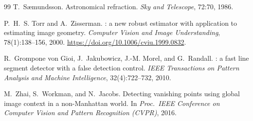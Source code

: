\documentclass[11pt,a4paper]{article}
\newcommand{\doi}[1]{\url{https://doi.org/#1}}
\begin{document}
\begin{thebibliography}{99}
T.~S{\ae}mundsson.
\newblock Astronomical refraction.
\newblock \emph{Sky and Telescope}, 72:70, 1986.

P.~H.~S. Torr and A.~Zisserman.
: a new robust estimator with application to estimating image geometry.
\newblock \emph{Computer Vision and Image Understanding}, 78(1):138--156, 2000.
\newblock \doi{10.1006/cviu.1999.0832}.

R.~Grompone von Gioi, J.~Jakubowicz, J.-M. Morel, and G.~Randall.
: a fast line segment detector with a false detection control.
\newblock \emph{IEEE Transactions on Pattern Analysis and Machine Intelligence}, 32(4):722--732, 2010.

M.~Zhai, S.~Workman, and N.~Jacobs.
\newblock Detecting vanishing points using global image context in a non-{Manhattan} world.
\newblock In \emph{Proc.\ IEEE Conference on Computer Vision and Pattern Recognition (CVPR)}, 2016.

\end{thebibliography}
\end{document}
